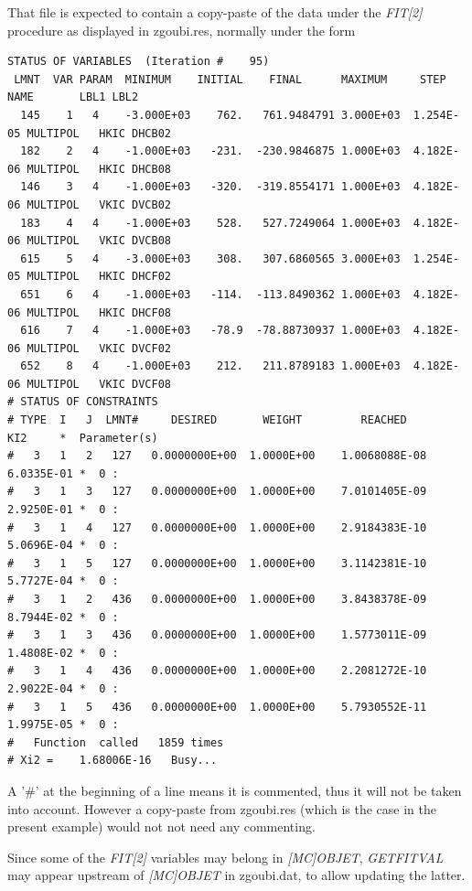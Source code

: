 \noindent That file is expected to contain a copy-paste of the data under the \textsl{FIT[2]} procedure as 
displayed in zgoubi.res, normally under the form \\
\begin{center}
{\footnotesize
\begin{verbatim}
STATUS OF VARIABLES  (Iteration #    95)
 LMNT  VAR PARAM  MINIMUM    INITIAL    FINAL      MAXIMUM     STEP    NAME       LBL1 LBL2
  145    1   4    -3.000E+03    762.   761.9484791 3.000E+03  1.254E-05 MULTIPOL   HKIC DHCB02
  182    2   4    -1.000E+03   -231.  -230.9846875 1.000E+03  4.182E-06 MULTIPOL   HKIC DHCB08  
  146    3   4    -1.000E+03   -320.  -319.8554171 1.000E+03  4.182E-06 MULTIPOL   VKIC DVCB02  
  183    4   4    -1.000E+03    528.   527.7249064 1.000E+03  4.182E-06 MULTIPOL   VKIC DVCB08  
  615    5   4    -3.000E+03    308.   307.6860565 3.000E+03  1.254E-05 MULTIPOL   HKIC DHCF02  
  651    6   4    -1.000E+03   -114.  -113.8490362 1.000E+03  4.182E-06 MULTIPOL   HKIC DHCF08  
  616    7   4    -1.000E+03   -78.9  -78.88730937 1.000E+03  4.182E-06 MULTIPOL   VKIC DVCF02  
  652    8   4    -1.000E+03    212.   211.8789183 1.000E+03  4.182E-06 MULTIPOL   VKIC DVCF08  
# STATUS OF CONSTRAINTS
# TYPE  I   J  LMNT#     DESIRED       WEIGHT         REACHED         KI2     *  Parameter(s) 
#   3   1   2   127   0.0000000E+00  1.0000E+00    1.0068088E-08   6.0335E-01 *  0 : 
#   3   1   3   127   0.0000000E+00  1.0000E+00    7.0101405E-09   2.9250E-01 *  0 : 
#   3   1   4   127   0.0000000E+00  1.0000E+00    2.9184383E-10   5.0696E-04 *  0 : 
#   3   1   5   127   0.0000000E+00  1.0000E+00    3.1142381E-10   5.7727E-04 *  0 : 
#   3   1   2   436   0.0000000E+00  1.0000E+00    3.8438378E-09   8.7944E-02 *  0 : 
#   3   1   3   436   0.0000000E+00  1.0000E+00    1.5773011E-09   1.4808E-02 *  0 : 
#   3   1   4   436   0.0000000E+00  1.0000E+00    2.2081272E-10   2.9022E-04 *  0 : 
#   3   1   5   436   0.0000000E+00  1.0000E+00    5.7930552E-11   1.9975E-05 *  0 : 
#   Function  called   1859 times
# Xi2 =    1.68006E-16   Busy...
\end{verbatim}
}
\end{center}

\noindent A '\#' at the beginning of a line means it is commented, thus it will not be taken into account. 
However a copy-paste from zgoubi.res (which is the case in the present example) would not not need any commenting. 

\medskip

\noindent Since some of the \textsl{FIT[2]} variables may belong in \textsl{[MC]OBJET}, \textsl{GETFITVAL} may appear 
upstream of  \textsl{[MC]OBJET} in zgoubi.dat, to allow updating the latter. 

